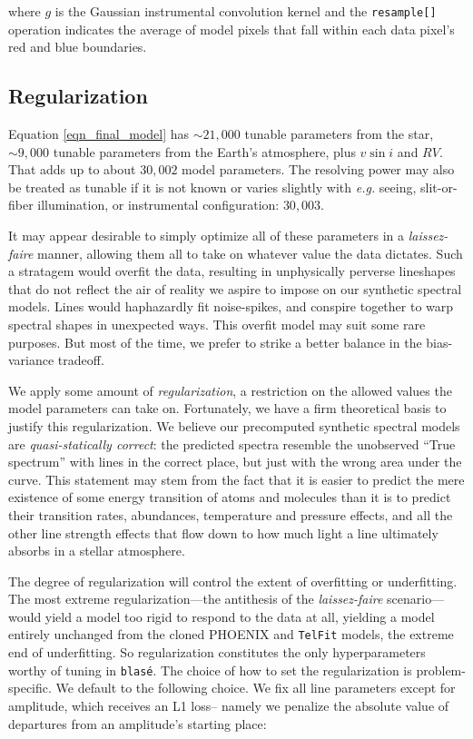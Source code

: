 \documentclass[twocolumn]{aastex631}
\begin{document}
where $g$ is the Gaussian instrumental convolution kernel and the \texttt{resample[]} operation indicates the average of model pixels that fall within each data pixel's red and blue boundaries.

\subsection{Regularization}

Equation \ref{eqn_final_model} has $\sim21,000$ tunable parameters from the star, $\sim9,000$ tunable parameters from the Earth's atmosphere, plus $v\sin{i}$ and $RV$.  That adds up to about $30,002$ model parameters.  The resolving power may also be treated as tunable if it is not known or varies slightly with \emph{e.g.} seeing, slit-or-fiber illumination, or instrumental configuration: $30,003$.

It may appear desirable to simply optimize all of these parameters in a \emph{laissez-faire} manner, allowing them all to take on whatever value the data dictates.  Such a stratagem would overfit the data, resulting in unphysically perverse lineshapes that do not reflect the air of reality we aspire to impose on our synthetic spectral models.  Lines would haphazardly fit noise-spikes, and conspire together to warp spectral shapes in unexpected ways.  This overfit model may suit some rare purposes.  But most of the time, we prefer to strike a better balance in the bias-variance tradeoff.

We apply some amount of \emph{regularization}, a restriction on the allowed values the model parameters can take on.  Fortunately, we have a firm theoretical basis to justify this regularization.  We believe our precomputed synthetic spectral models are \emph{quasi-statically correct}: the predicted spectra resemble the unobserved ``True spectrum'' with lines in the correct place, but just with the wrong area under the curve.  This statement may stem from the fact that it is easier to predict the mere existence of some energy transition of atoms and molecules than it is to predict their transition rates, abundances, temperature and pressure effects, and all the other line strength effects that flow down to how much light a line ultimately absorbs in a stellar atmosphere.

The degree of regularization will control the extent of overfitting or underfitting. The most extreme regularization---the antithesis of the \emph{laissez-faire} scenario---would yield a model too rigid to respond to the data at all, yielding a model entirely unchanged from the cloned PHOENIX and \texttt{TelFit} models, the extreme end of underfitting.  So regularization constitutes the only hyperparameters worthy of tuning in \texttt{blas\'e}.  The choice of how to set the regularization is problem-specific.  We default to the following choice. We fix all line parameters except for amplitude, which receives an L1 loss-- namely we penalize the absolute value of departures from an amplitude's starting place:
\end{document}
